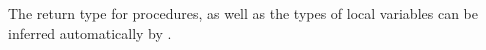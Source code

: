The return type for procedures, as well as the types of local variables can be
inferred automatically by \EasyCrypt.

%
%
%
%
%
%
